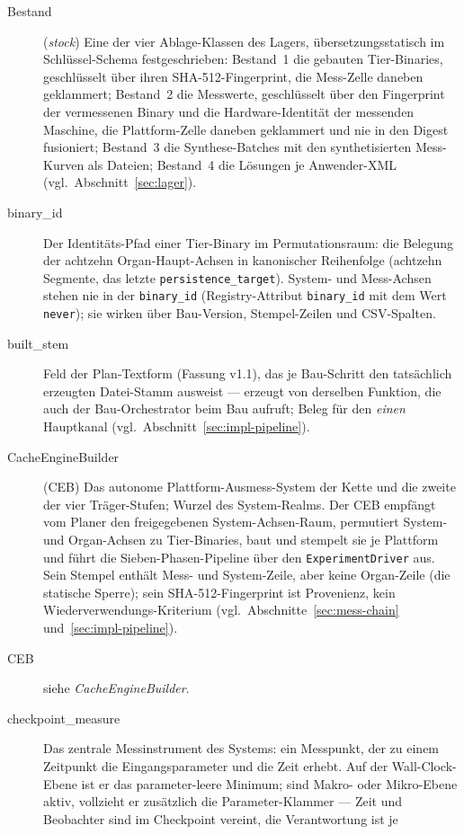\begin{description}
  \item[Bestand] (\emph{stock}) Eine der vier Ablage-Klassen des Lagers, übersetzungsstatisch im
  Schlüssel-Schema festgeschrieben: Bestand~1 die gebauten Tier-Binaries, geschlüsselt über ihren
  SHA-512-Fingerprint, die Mess-Zelle daneben geklammert; Bestand~2 die Messwerte, geschlüsselt
  über den Fingerprint der vermessenen Binary und die Hardware-Identität der messenden Maschine, die
  Plattform-Zelle daneben geklammert und nie in den Digest fusioniert; Bestand~3 die
  Synthese-Batches mit den synthetisierten Mess-Kurven als Dateien; Bestand~4 die Lösungen je
  Anwender-XML (vgl.\ Abschnitt~\ref{sec:lager}).
  \item[binary\_id] Der Identitäts-Pfad einer Tier-Binary im Permutationsraum: die Belegung der
  achtzehn Organ-Haupt-Achsen in kanonischer Reihenfolge (achtzehn Segmente, das letzte
  \texttt{persistence\_target}). System- und Mess-Achsen stehen nie in der \texttt{binary\_id}
  (Registry-Attribut \texttt{binary\_id} mit dem Wert \texttt{never}); sie wirken über Bau-Version,
  Stempel-Zeilen und CSV-Spalten.
  \item[built\_stem] Feld der Plan-Textform (Fassung v1.1), das je Bau-Schritt den tatsächlich erzeugten
  Datei-Stamm ausweist --- erzeugt von derselben Funktion, die auch der Bau-Orchestrator beim
  Bau aufruft; Beleg für den \emph{einen} Hauptkanal (vgl.\ Abschnitt~\ref{sec:impl-pipeline}).
  \item[CacheEngineBuilder] (CEB) Das autonome Plattform-Ausmess-System der Kette und die zweite
  der vier Träger-Stufen; Wurzel des System-Realms. Der CEB empfängt vom Planer den freigegebenen
  System-Achsen-Raum, permutiert System- und Organ-Achsen zu Tier-Binaries, baut und stempelt sie
  je Plattform und führt die Sieben-Phasen-Pipeline über den \texttt{ExperimentDriver} aus. Sein
  Stempel enthält Mess- und System-Zeile, aber keine Organ-Zeile (die statische Sperre); sein
  SHA-512-Fingerprint ist Provenienz, kein Wiederverwendungs-Kriterium
  (vgl.\ Abschnitte~\ref{sec:mess-chain} und~\ref{sec:impl-pipeline}).
  \item[CEB] siehe \emph{CacheEngineBuilder}.
  \item[checkpoint\_measure] Das zentrale Messinstrument des Systems: ein Messpunkt, der zu einem
  Zeitpunkt die Eingangsparameter und die Zeit erhebt. Auf der Wall-Clock-Ebene ist er das
  parameter-leere Minimum; sind Makro- oder Mikro-Ebene aktiv, vollzieht er zusätzlich die
  Parameter-Klammer --- Zeit und Beobachter sind im Checkpoint vereint, die Verantwortung ist je

\end{description}
